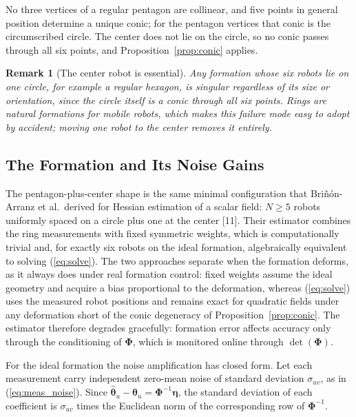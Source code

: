 \documentclass[lettersize,journal]{IEEEtran}
\newtheorem{remark}{Remark}
\begin{document}
\begin{IEEEproof}
No three vertices of a regular pentagon are collinear, and five points in
general position determine a unique conic; for the pentagon vertices that
conic is the circumscribed circle. The center does not lie on the
circle, so no conic passes through all six points, and
Proposition~\ref{prop:conic} applies.
\end{IEEEproof}

\begin{remark}[The center robot is essential]
Any formation whose six robots lie on one circle, for example a regular
hexagon, is singular regardless of its size or orientation, since the
circle itself is a conic through all six points. Rings are natural
formations for mobile robots, which makes this failure mode easy to adopt
by accident; moving one robot to the center removes it entirely.
\end{remark}

\subsection{The Formation and Its Noise Gains}
\label{sec:formation}

The pentagon-plus-center shape is the same minimal configuration that
Bri\~{n}\'{o}n-Arranz et al.\ derived for Hessian estimation of a scalar
field: $N \geq 5$ robots uniformly spaced on a circle plus one at the
center [11]. Their estimator combines the ring measurements with fixed
symmetric weights, which is computationally trivial and, for exactly six
robots on the ideal formation, algebraically equivalent to solving
(\ref{eq:solve}). The two approaches separate when the formation deforms,
as it always does under real formation control: fixed weights assume the
ideal geometry and acquire a bias proportional to the deformation,
whereas (\ref{eq:solve}) uses the measured robot positions and remains
exact for quadratic fields under any deformation short of the conic
degeneracy of Proposition~\ref{prop:conic}. The estimator therefore
degrades gracefully: formation error affects accuracy only through the
conditioning of $\boldsymbol{\Phi}$, which is monitored online through
$\det(\boldsymbol{\Phi})$.

For the ideal formation the noise amplification has closed form. Let each
measurement carry independent zero-mean noise of standard deviation
$\sigma_{uv}$, as in (\ref{eq:meas_noise}). Since
$\hat{\boldsymbol{\theta}}_u - \boldsymbol{\theta}_u =
\boldsymbol{\Phi}^{-1}\boldsymbol{\eta}$, the standard deviation of each
coefficient is $\sigma_{uv}$ times the Euclidean norm of the
corresponding row of $\boldsymbol{\Phi}^{-1}$.
\end{document}
